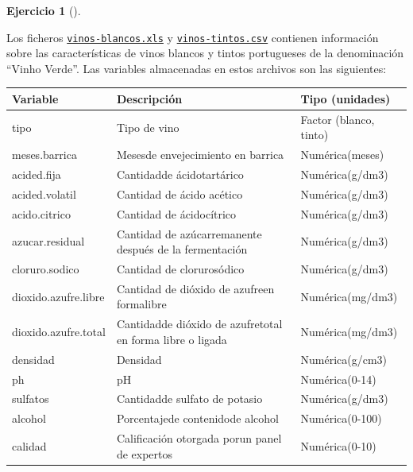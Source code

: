 \documentclass[
  a4paper,
]{scrreport}
\theoremstyle{definition}
\newtheorem{exercise}{Ejercicio}[chapter]
\theoremstyle{remark}
\begin{document}
\begin{exercise}[]\protect\hypertarget{exr-preprocesaimento-5}{}\label{exr-preprocesaimento-5}

Los ficheros \href{datos/vinos-blancos.xls}{\texttt{vinos-blancos.xls}}
y \href{datos/vinos-tintos.csv}{\texttt{vinos-tintos.csv}} contienen
información sobre las características de vinos blancos y tintos
portugueses de la denominación ``Vinho Verde''. Las variables
almacenadas en estos archivos son las siguientes:

\begin{longtable}[]{@{}
  >{\raggedright\arraybackslash}p{}
  >{\raggedright\arraybackslash}p{}
  >{\raggedright\arraybackslash}p{}@{}}
\toprule\noalign{}
\begin{minipage}[b]{\linewidth}\raggedright
Variable
\end{minipage} & \begin{minipage}[b]{\linewidth}\raggedright
Descripción
\end{minipage} & \begin{minipage}[b]{\linewidth}\raggedright
Tipo (unidades)
\end{minipage} \\
\midrule\noalign{}
\endhead
\bottomrule\noalign{}
\endlastfoot
tipo & Tipo de vino & Factor (blanco, tinto) \\
meses.barrica & Mesesde envejecimiento en barrica & Numérica(meses) \\
acided.fija & Cantidadde ácidotartárico & Numérica(g/dm3) \\
acided.volatil & Cantidad de ácido acético & Numérica(g/dm3) \\
acido.citrico & Cantidad de ácidocítrico & Numérica(g/dm3) \\
azucar.residual & Cantidad de azúcarremanente después de la fermentación
& Numérica(g/dm3) \\
cloruro.sodico & Cantidad de clorurosódico & Numérica(g/dm3) \\
dioxido.azufre.libre & Cantidad de dióxido de azufreen formalibre &
Numérica(mg/dm3) \\
dioxido.azufre.total & Cantidadde dióxido de azufretotal en forma libre
o ligada & Numérica(mg/dm3) \\
densidad & Densidad & Numérica(g/cm3) \\
ph & pH & Numérica(0-14) \\
sulfatos & Cantidadde sulfato de potasio & Numérica(g/dm3) \\
alcohol & Porcentajede contenidode alcohol & Numérica(0-100) \\
calidad & Calificación otorgada porun panel de expertos &
Numérica(0-10) \\
\end{longtable}


\end{exercise}
\end{document}
